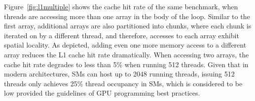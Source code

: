 Figure~\ref{fig:l1multiple} shows the cache hit rate of the same benchmark, when threads are
accessing more than one array in the body of the loop. Similar to the first array, additional arrays
are also partitioned into chunks, where each chunk is iterated on by a different thread, and
therefore, accesses to each array exhibit spatial locality. As depicted, adding even one more memory
access to a different array reduces the L1 cache hit rate dramatically. When accessing two arrays,
the cache hit rate degrades to less than 5\% when running 512 threads. Given that in modern
architectures, SMs can host up to 2048 running threads, issuing 512 threads only achieves 25\%
thread occupancy in SMs, which is considered to be low provided the guidelines of GPU programming
best practices.


